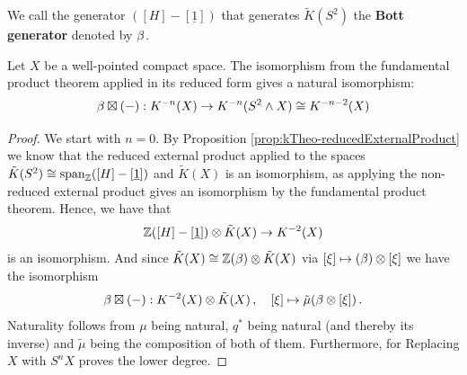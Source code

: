 \begin{definition}\label{def:kTheo-BottGenerator}
	We call the generator $([H]-[\underline{1}])$ that generates $\tilde{K}(S^2)$ the \textbf{Bott generator} denoted by $\beta$.
\end{definition}

\begin{theorem} \label{thm:Ktheo-BottPeriodicity}
	Let $X$ be a well-pointed compact space.
	The isomorphism from the fundamental product theorem applied in its reduced form gives a natural isomorphism:
	\begin{equation*}
		\beta\boxtimes(-): {K}^{-n}(X)\to {K}^{-n}(S^2\wedge X)\cong {K}^{-n-2}( X)
	\end{equation*}
\end{theorem}
\begin{proof} We start with $n=0$.
	By Proposition \ref{prop:kTheo-reducedExternalProduct} we know that the reduced external product applied to the spaces $\tilde{K}(S^2)\cong \mathrm{span}_{\mathbb{Z}}([H]-[\underline{1}]) $ and $\tilde{K}(X)$ is an isomorphism, as applying the non-reduced external product gives an isomorphism by the fundamental product theorem. Hence, we have that
	\begin{equation*}
		\mathbb{Z}([H]-[\underline{1}])\otimes \tilde{K}(X)\to {K}^{-2}(X)
	\end{equation*} is an isomorphism. And since $\tilde{K}(X)\cong \mathbb{Z}(\beta)\otimes \tilde{K}(X)$ via $[\xi]\mapsto (\beta) \otimes [\xi]$ we have the isomorphism
	\begin{equation*}
		\beta\boxtimes(-): {K}^{-2}(X) \otimes \tilde{K}(X) \,,\quad [\xi] \mapsto \tilde{\mu}(\beta \otimes [\xi])\,.
	\end{equation*}Naturality follows from $\mu$ being natural, $q^*$ being natural (and thereby its inverse) and $\tilde{\mu}$ being the composition of both of them. Furthermore, for  Replacing $X$ with $S^nX$ proves the lower degree.
\end{proof}

